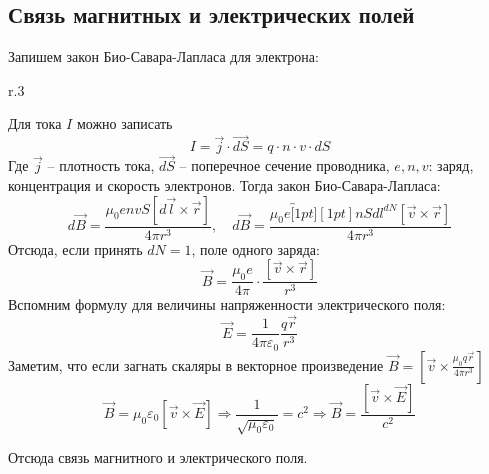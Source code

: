 \subsection{Связь магнитных и электрических полей}

Запишем закон Био-Савара-Лапласа для электрона:

\setlength\intextsep{0.5cm}
\setlength\columnsep{0.5cm}
\begin{wrapfigure}[8]{r}{.3\textwidth}
\begin{center}
\end{center}
\end{wrapfigure}
Для тока $I$ можно записать
\begin{equation*}
    I = \vec{j} \cdot \vec{dS} = q \cdot n \cdot v \cdot dS
\end{equation*}
Где $\vec{j}$ -- плотность тока, $\vec{dS}$ -- поперечное сечение проводника, $e, n, v$:  заряд, концентрация и скорость электронов. Тогда закон Био-Савара-Лапласа:
\setlength{\abovedisplayskip}{3pt}\setlength{\belowdisplayskip}{1.5pt}\begin{equation*}
    d\vec{B} = \frac{\mu_0 e n v S [d \vec{l} \times \vec{r}]}{4 \pi r^3}, \quad
    d\vec{B} = \frac{\mu_0 e \overbracket[1pt][1pt]{n S dl}^{dN} [\vec{v} \times \vec{r}]}{4 \pi r^3}
\end{equation*}
Отсюда, если принять $dN = 1$, поле одного заряда:
\begin{equation}
    \boxed{\vec{B} = \frac{\mu_0 e}{4 \pi} \cdot \frac{[\vec{v} \times \vec{r}]}{r^3}}
    \label{eq:scmf}
\end{equation}
Вспомним формулу для величины напряженности электрического поля:
\begin{equation*}
    \vec{E} = \frac{1}{4 \pi \varepsilon_0} \frac{q \vec{r}}{r^3}
\end{equation*}
Заметим, что если загнать скаляры в векторное произведение $\displaystyle\vec{B} = \left[\vec{v} \times \frac{\mu_0 q \vec{r}}{4 \pi r^3}\right]$
\begin{equation*}
    \vec{B} = \mu_0 \varepsilon_0 [\vec{v} \times \vec{E}] \Longrightarrow \frac{1}{\sqrt{\mu_0 \varepsilon_0}} = c^2 \Longrightarrow \boxed{\vec{B} = \frac{[\vec{v} \times \vec{E}]}{c^2}}
\end{equation*}
\setlength{\abovedisplayskip}{12.0pt plus 3.0pt
minus 7.0pt}
\setlength{\belowdisplayskip}{12.0pt plus 3.0pt
minus 7.0pt}

Отсюда связь магнитного и электрического поля. 
